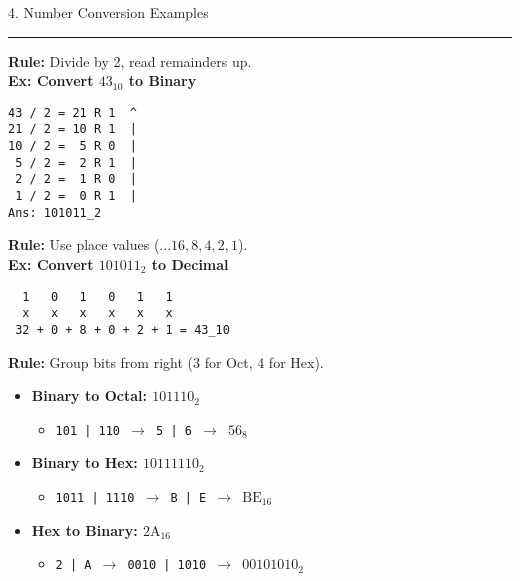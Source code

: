 \documentclass[a4paper, 8pt]{extarticle}
\newcommand{\sectionheading}[1]{%
  \par\vspace{0.7em}
  {\headingfont\fontsize{10.5pt}{11.5pt}\selectfont\color{black}#1}\par\nopagebreak
  \rule{\linewidth}{0.4pt}\vspace{0.2em}\nopagebreak
}
\begin{document}
\begin{multicols}{2}
\columnbreak

\sectionheading{4. Number Conversion Examples}

\begin{tcolorbox}[title=Decimal $\rightarrow$ Binary (Integer)]
\textbf{Rule:} Divide by 2, read remainders up. \\
\textbf{Ex: Convert $43_{10}$ to Binary}
\begin{verbatim}
43 / 2 = 21 R 1  ^
21 / 2 = 10 R 1  |
10 / 2 =  5 R 0  |
 5 / 2 =  2 R 1  |
 2 / 2 =  1 R 0  |
 1 / 2 =  0 R 1  |
Ans: 101011_2
\end{verbatim}
\end{tcolorbox}

\begin{tcolorbox}[title=Binary $\rightarrow$ Decimal]
\textbf{Rule:} Use place values ($...16, 8, 4, 2, 1$). \\
\textbf{Ex: Convert $101011_2$ to Decimal}
\begin{verbatim}
  1   0   1   0   1   1
  x   x   x   x   x   x
 32 + 0 + 8 + 0 + 2 + 1 = 43_10
\end{verbatim}
\end{tcolorbox}

\begin{tcolorbox}[title=Binary $\leftrightarrow$ Octal \& Hex]
\textbf{Rule:} Group bits from right (3 for Oct, 4 for Hex).
\begin{itemize}
    \item \textbf{Binary to Octal: $101110_2$}
    \begin{itemize}
        \item \texttt{101 | 110 $\rightarrow$ 5 | 6 $\rightarrow$ $56_8$}
    \end{itemize}
    \item \textbf{Binary to Hex: $10111110_2$}
    \begin{itemize}
        \item \texttt{1011 | 1110 $\rightarrow$ B | E $\rightarrow$ $\text{BE}_{16}$}
    \end{itemize}
    \item \textbf{Hex to Binary: $2\text{A}_16$}
     \begin{itemize}
        \item \texttt{2 | A $\rightarrow$ 0010 | 1010 $\rightarrow$ $00101010_2$}
    \end{itemize}
\end{itemize}
\end{tcolorbox}


\end{multicols}
\end{document}
